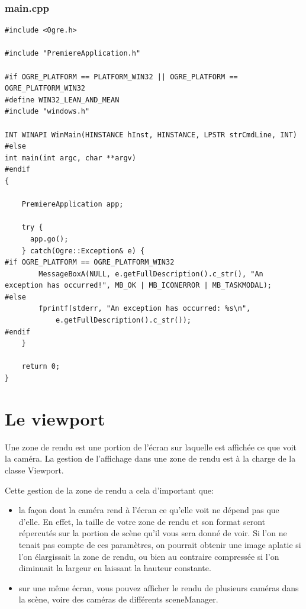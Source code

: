 \subsubsection{main.cpp}
\begin{lstlisting}[caption={main.cpp: Création de la caméra}]
#include <Ogre.h>

#include "PremiereApplication.h"

#if OGRE_PLATFORM == PLATFORM_WIN32 || OGRE_PLATFORM == OGRE_PLATFORM_WIN32
#define WIN32_LEAN_AND_MEAN
#include "windows.h"

INT WINAPI WinMain(HINSTANCE hInst, HINSTANCE, LPSTR strCmdLine, INT)
#else
int main(int argc, char **argv)
#endif
{

    PremiereApplication app;
    
    try {
      app.go();
    } catch(Ogre::Exception& e) {
#if OGRE_PLATFORM == OGRE_PLATFORM_WIN32
        MessageBoxA(NULL, e.getFullDescription().c_str(), "An exception has occurred!", MB_OK | MB_ICONERROR | MB_TASKMODAL);
#else
        fprintf(stderr, "An exception has occurred: %s\n",
            e.getFullDescription().c_str());
#endif
    }

    return 0;
}
\end{lstlisting}




































\section{Le viewport}

Une zone de rendu est une portion de l'écran sur laquelle est affichée ce que voit la caméra. La gestion de l'affichage dans une zone de rendu est à la charge de la classe Viewport.

Cette gestion de la zone de rendu a cela d'important que:
\begin{itemize}
\item la fa\c{c}on dont la caméra rend à l'écran ce qu'elle voit ne dépend pas que d'elle. En effet, la taille de votre zone de rendu et son format seront répercutés sur la portion de scène qu'il vous sera donné de voir. Si l'on ne tenait pas compte de ces paramètres, on pourrait obtenir une image aplatie si l'on élargissait la zone de rendu, ou bien au contraire compressée si l'on diminuait la largeur en laissant la hauteur constante.
\item sur une même écran, vous pouvez afficher le rendu de plusieurs caméras dans la scène, voire des caméras de différents sceneManager.
\end{itemize}


